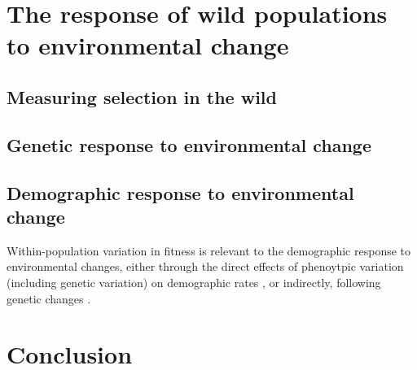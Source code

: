 \section{The response of wild populations to environmental change}

\subsection{Measuring selection in the wild}



\subsection{Genetic response to environmental change}

\subsection{Demographic response to environmental change}
Within-population variation in fitness is relevant to the demographic response to environmental changes, either through the direct effects of phenoytpic variation (including genetic variation) on demographic rates \parencite{Kendall2011, vindenes2015, Plard2016}, or indirectly, following genetic changes \parencite{Chevin2010a, Turcotte2011, Schiffers2013a}. 

\section{Conclusion}


\printbibliography[heading=subbibliography]

